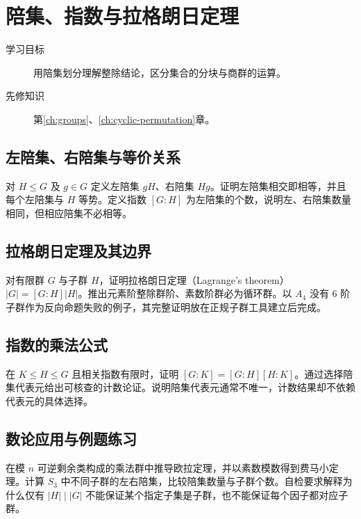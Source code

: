 \setcounter{chapter}{3} %
\chapter{陪集、指数与拉格朗日定理}\label{ch:cosets}

\begin{description}
  \item[学习目标] 用陪集划分理解整除结论，区分集合的分块与商群的运算。
  \item[先修知识] 第\ref{ch:groups}、\ref{ch:cyclic-permutation}章。
\end{description}

\section{左陪集、右陪集与等价关系}
对 $H\leq G$ 及 $g\in G$ 定义左陪集 $gH$、右陪集 $Hg$。证明左陪集相交即相等，并且每个左陪集与 $H$ 等势。定义指数 $[G:H]$ 为左陪集的个数，说明左、右陪集数量相同，但相应陪集不必相等。

\section{拉格朗日定理及其边界}
对有限群 $G$ 与子群 $H$，证明拉格朗日定理（Lagrange's theorem）$|G|=[G:H]|H|$。推出元素阶整除群阶、素数阶群必为循环群。以 $A_4$ 没有 $6$ 阶子群作为反向命题失败的例子，其完整证明放在正规子群工具建立后完成。

\section{指数的乘法公式}
在 $K\leq H\leq G$ 且相关指数有限时，证明 $[G:K]=[G:H][H:K]$。通过选择陪集代表元给出可核查的计数论证。说明陪集代表元通常不唯一，计数结果却不依赖代表元的具体选择。

\section{数论应用与例题练习}
在模 $n$ 可逆剩余类构成的乘法群中推导欧拉定理，并以素数模数得到费马小定理。计算 $S_3$ 中不同子群的左右陪集，比较陪集数量与子群个数。自检要求解释为什么仅有 $|H|\mid |G|$ 不能保证某个指定子集是子群，也不能保证每个因子都对应子群。

